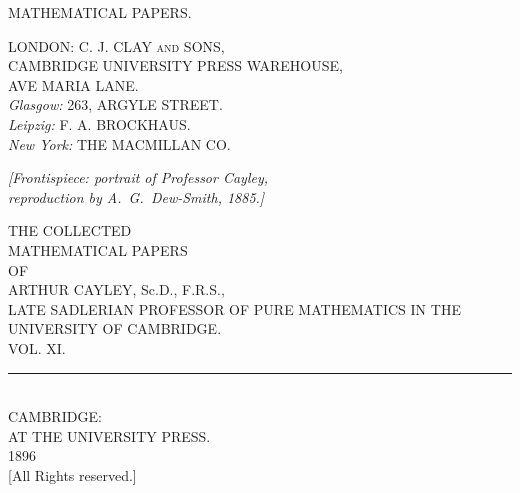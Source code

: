 \documentclass[12pt,a4paper,oneside]{book}
\begin{document}
\frontmatter

\thispagestyle{empty}
\begin{center}
\vspace*{\fill}
{\Large MATHEMATICAL PAPERS.}
\vspace*{\fill}
\end{center}
\clearpage

\thispagestyle{empty}
\begin{center}
\vspace*{\fill}
\small
LONDON: C. J. CLAY \textsc{and} SONS,\\
CAMBRIDGE UNIVERSITY PRESS WAREHOUSE,\\
AVE MARIA LANE.\\[1em]
\textit{Glasgow:} 263, ARGYLE STREET.\\[1.5em]
\textit{Leipzig:} F. A. BROCKHAUS.\\
\textit{New York:} THE MACMILLAN CO.
\vspace*{\fill}
\end{center}
\clearpage

\thispagestyle{empty}
\vspace*{\fill}
\begin{center}
\textit{[Frontispiece: portrait of Professor Cayley,\\
reproduction by A.~G.~Dew-Smith, 1885.]}
\end{center}
\vspace*{\fill}
\clearpage

\thispagestyle{empty}
\begin{center}
\vspace*{2em}
{\large THE COLLECTED}\\[1em]
{\LARGE MATHEMATICAL PAPERS}\\[2em]
{\large OF}\\[2em]
{\Large ARTHUR CAYLEY, Sc.D., F.R.S.,}\\[0.5em]
{\footnotesize LATE SADLERIAN PROFESSOR OF PURE MATHEMATICS IN THE UNIVERSITY OF CAMBRIDGE.}\\[4em]
{\Large VOL. XI.}\\[5em]
\rule{0.3\textwidth}{0.4pt}\\[1em]
CAMBRIDGE:\\
AT THE UNIVERSITY PRESS.\\
1896\\[0.5em]
{\small [All Rights reserved.]}
\end{center}
\clearpage
\end{document}
